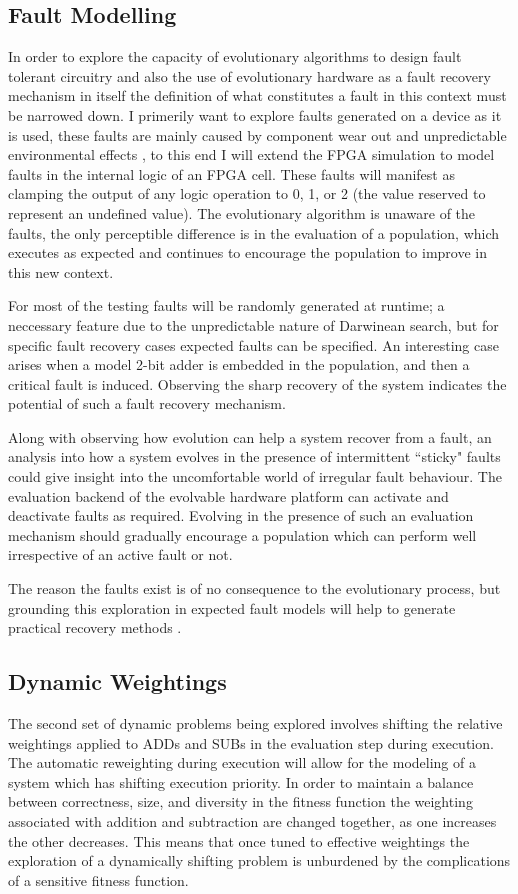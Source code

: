 \subsection{Fault Modelling}
In order to explore the capacity of evolutionary algorithms to design fault
tolerant circuitry and also the use of evolutionary hardware as a fault
recovery mechanism in itself the definition of what constitutes a fault in
this context must be narrowed down. I primerily want to explore faults
generated on a device as it is used, these faults are mainly caused by
component wear out and unpredictable environmental effects \cite{4291951}, to
this end I will extend the FPGA simulation to model
faults in the internal logic of an FPGA cell. These faults will manifest as clamping
the output of any logic operation to 0, 1, or 2 (the value reserved to represent
an undefined value). The evolutionary algorithm is unaware of the
faults, the only perceptible difference is in the evaluation of a population,
which executes as expected and continues to encourage the population to improve in this
new context.

For most of the testing faults will be randomly generated at runtime; a neccessary
feature due to the unpredictable nature of Darwinean search, but for specific
fault recovery cases expected faults can be specified. An interesting case arises when
a model 2-bit adder is embedded in the population, and then a critical fault is
induced. Observing the sharp recovery of the system indicates the potential of
such a fault recovery mechanism.

Along with observing how evolution can help a system recover from a fault, an
analysis into how a system evolves in the presence of intermittent ``sticky"
faults could give insight into the uncomfortable world of irregular fault behaviour.
The evaluation backend of the evolvable hardware platform can activate and
deactivate faults as required. Evolving in the presence of such an evaluation
mechanism should gradually encourage a population which can perform well
irrespective of an active fault or not.

The reason the faults exist is of no consequence to the evolutionary process,
but grounding this exploration in expected fault models will help to generate
practical recovery methods \cite{10.1007/3-540-36553-2_5}.

\subsection{Dynamic Weightings}
The second set of dynamic problems being explored involves shifting the relative
weightings applied to ADDs and SUBs in the evaluation step during execution. The
automatic reweighting during execution will allow for the modeling of a system
which has shifting execution priority. In order to maintain a balance between
correctness, size, and diversity in the fitness function the weighting associated
with addition and subtraction are changed together, as one increases the other
decreases. This means that once tuned to effective weightings the exploration of
a dynamically shifting problem is unburdened by the complications of a sensitive
fitness function.

